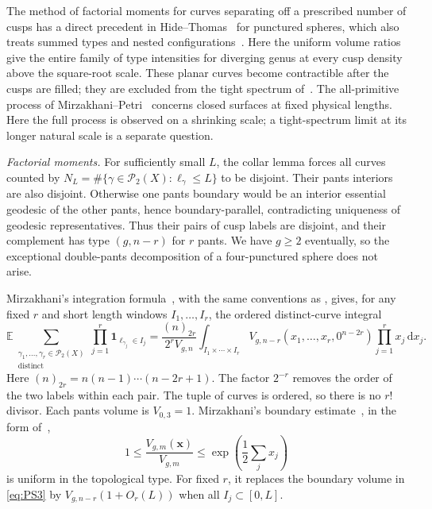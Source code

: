 The method of factorial moments for curves separating off a prescribed
number of cusps has a direct precedent in Hide--Thomas~\cite[Theorem~1.7]{HTSphere}
for punctured spheres, which also treats summed types and nested
configurations~\cite[Remark~1.9 and Proposition~3.6]{HTSphere}. Here the uniform volume ratios
give the entire family of type intensities for diverging genus at every
cusp density above the square-root scale. These planar curves
become contractible after the cusps are filled; they are excluded from
the tight spectrum of~\cite[Definition~2.1]{BL}. The all-primitive
process of Mirzakhani--Petri~\cite[Theorem~4.1]{MP} concerns closed
surfaces at fixed physical lengths. Here the full process is observed
on a shrinking scale; a tight-spectrum limit at its longer natural
scale is a separate question.

\emph{Factorial moments.} For sufficiently small $L$, the collar lemma forces all curves counted by
$N_L=\#\{\gamma\in\mathcal P_2(X):\ell_\gamma\le L\}$ to be disjoint.
Their pants interiors are also disjoint. Otherwise one pants boundary
would be an interior essential geodesic of the other pants, hence
boundary-parallel, contradicting uniqueness of geodesic representatives.
Thus their pairs of cusp labels are disjoint, and their complement has
type $(g,n-r)$ for $r$ pants. We have $g\ge2$ eventually, so the
exceptional double-pants decomposition of a four-punctured sphere does
not arise.

Mirzakhani's integration formula~\cite{MirInv,Mir}, with the same conventions as
\cite[Lemma~29]{SW}, gives, for any fixed $r$ and short length windows
$I_1,\ldots,I_r$, the ordered distinct-curve integral
\begin{equation}
 \mathbb E\!\sum_{\substack{\gamma_1,\ldots,\gamma_r\in\mathcal P_2(X)\\
                            \text{distinct}}}
       \prod_{j=1}^r\mathbf1_{\ell_{\gamma_j}\in I_j}
 =\frac{(n)_{2r}}{2^r V_{g,n}}
    \int_{I_1\times\cdots\times I_r}
       V_{g,n-r}(x_1,\ldots,x_r,0^{n-2r})
       \prod_{j=1}^r x_j\,\mathrm{d}x_j.
 \label{eq:PS3}
\end{equation}
Here $(n)_{2r}=n(n-1)\cdots(n-2r+1)$. The factor $2^{-r}$ removes
the order of the two labels within each pair. The tuple of curves is
ordered, so there is no $r!$ divisor. Each pants volume is $V_{0,3}=1$.
Mirzakhani's boundary estimate~\cite[Lemma~3.2]{Mir}, in the form
of~\cite[Lemma~14]{SW},
\begin{equation}
 1\le\frac{V_{g,m}(\mathbf x)}{V_{g,m}}
       \le\exp\!\left(\frac12\sum_jx_j\right)
 \label{eq:PS4}
\end{equation}
is uniform in the topological type. For fixed $r$, it replaces the
boundary volume in \eqref{eq:PS3} by $V_{g,n-r}(1+O_r(L))$ when
all $I_j\subset[0,L]$.

